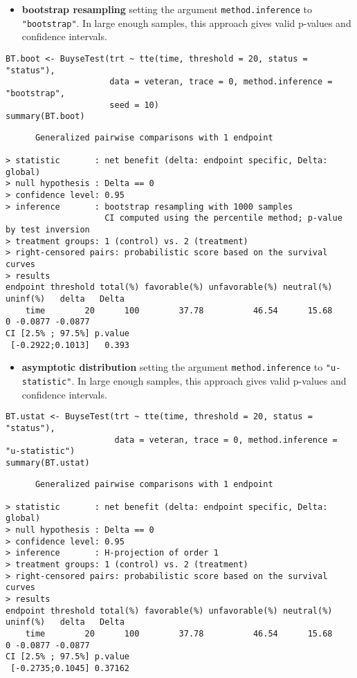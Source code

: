 \documentclass[12pt]{article}
\begin{document}
\begin{itemize}
\item \textbf{bootstrap resampling} setting the argument \texttt{method.inference} to
\texttt{"bootstrap"}. In large enough samples, this approach gives valid
p-values and confidence intervals.
\end{itemize}

\lstset{language=r,label= ,caption= ,captionpos=b,numbers=none}
\begin{lstlisting}
BT.boot <- BuyseTest(trt ~ tte(time, threshold = 20, status = "status"),
					 data = veteran, trace = 0, method.inference = "bootstrap",
					 seed = 10) 
summary(BT.boot)
\end{lstlisting}

\begin{verbatim}
      Generalized pairwise comparisons with 1 endpoint

> statistic       : net benefit (delta: endpoint specific, Delta: global) 
> null hypothesis : Delta == 0 
> confidence level: 0.95 
> inference       : bootstrap resampling with 1000 samples 
                    CI computed using the percentile method; p-value by test inversion 
> treatment groups: 1 (control) vs. 2 (treatment) 
> right-censored pairs: probabilistic score based on the survival curves
> results
endpoint threshold total(%) favorable(%) unfavorable(%) neutral(%) uninf(%)   delta   Delta
    time        20      100        37.78          46.54      15.68        0 -0.0877 -0.0877
CI [2.5% ; 97.5%] p.value 
 [-0.2922;0.1013]   0.393
\end{verbatim}

\begin{itemize}
\item \textbf{asymptotic distribution} setting the argument \texttt{method.inference} to
\texttt{"u-statistic"}. In large enough samples, this approach gives valid
p-values and confidence intervals.
\end{itemize}

\lstset{language=r,label= ,caption= ,captionpos=b,numbers=none}
\begin{lstlisting}
BT.ustat <- BuyseTest(trt ~ tte(time, threshold = 20, status = "status"),
					  data = veteran, trace = 0, method.inference = "u-statistic") 
summary(BT.ustat)
\end{lstlisting}

\begin{verbatim}
      Generalized pairwise comparisons with 1 endpoint

> statistic       : net benefit (delta: endpoint specific, Delta: global) 
> null hypothesis : Delta == 0 
> confidence level: 0.95 
> inference       : H-projection of order 1
> treatment groups: 1 (control) vs. 2 (treatment) 
> right-censored pairs: probabilistic score based on the survival curves
> results
endpoint threshold total(%) favorable(%) unfavorable(%) neutral(%) uninf(%)   delta   Delta
    time        20      100        37.78          46.54      15.68        0 -0.0877 -0.0877
CI [2.5% ; 97.5%] p.value 
 [-0.2735;0.1045] 0.37162
\end{verbatim}
\end{document}
